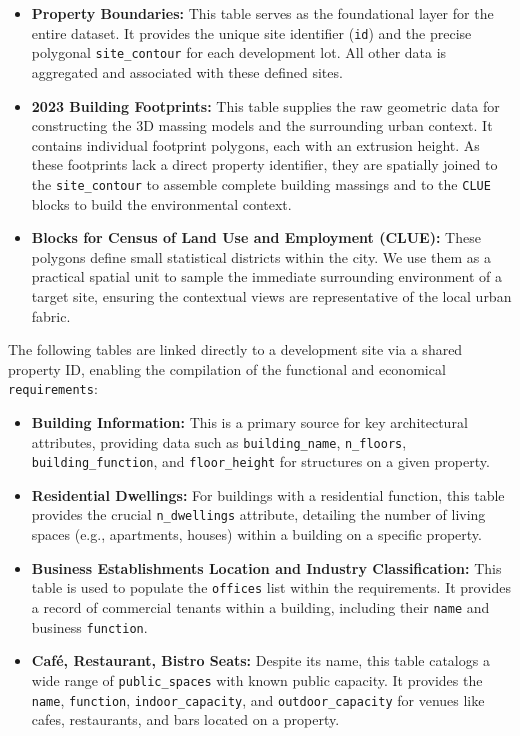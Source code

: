 \begin{itemize}
    \item \textbf{Property Boundaries:} This table serves as the foundational layer for the entire dataset. It provides the unique site identifier (\texttt{id}) and the precise polygonal \texttt{site\_contour} for each development lot. All other data is aggregated and associated with these defined sites.

    \item \textbf{2023 Building Footprints:} This table supplies the raw geometric data for constructing the 3D massing models and the surrounding urban context. It contains individual footprint polygons, each with an extrusion height. As these footprints lack a direct property identifier, they are spatially joined to the \texttt{site\_contour} to assemble complete building massings and to the \texttt{CLUE} blocks to build the environmental context.

    \item \textbf{Blocks for Census of Land Use and Employment (CLUE):} These polygons define small statistical districts within the city. We use them as a practical spatial unit to sample the immediate surrounding environment of a target site, ensuring the contextual views are representative of the local urban fabric.
\end{itemize}

The following tables are linked directly to a development site via a shared property ID, enabling the compilation of the functional and economical \texttt{requirements}:

\begin{itemize}
    \item \textbf{Building Information:} This is a primary source for key architectural attributes, providing data such as \texttt{building\_name}, \texttt{n\_floors}, \texttt{building\_function}, and \texttt{floor\_height} for structures on a given property.

    \item \textbf{Residential Dwellings:} For buildings with a residential function, this table provides the crucial \texttt{n\_dwellings} attribute, detailing the number of living spaces (e.g., apartments, houses) within a building on a specific property.

    \item \textbf{Business Establishments Location and Industry Classification:} This table is used to populate the \texttt{offices} list within the requirements. It provides a record of commercial tenants within a building, including their \texttt{name} and business \texttt{function}.

    \item \textbf{Café, Restaurant, Bistro Seats:} Despite its name, this table catalogs a wide range of \texttt{public\_spaces} with known public capacity. It provides the \texttt{name}, \texttt{function}, \texttt{indoor\_capacity}, and \texttt{outdoor\_capacity} for venues like cafes, restaurants, and bars located on a property.
\end{itemize}


